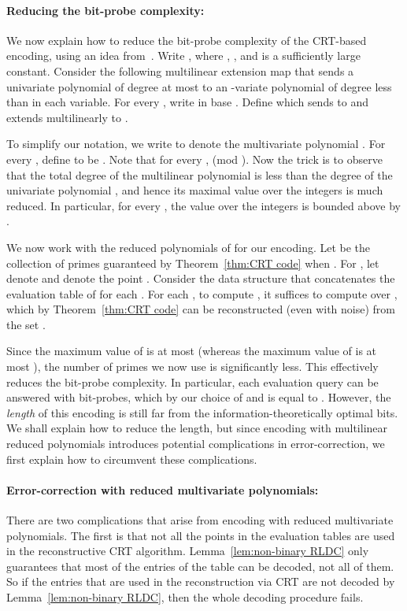 \documentclass[11pt,english]{article}
\theoremstyle{definition}
\theoremstyle{remark}
\begin{document}
\paragraph{\textbf{Reducing the bit-probe complexity:}}

We now explain how to reduce the bit-probe complexity of the CRT-based
encoding, using an idea from~\cite{kedl-umans}. Write , where
, , and  is a sufficiently
large constant. Consider the following multilinear extension map 
that sends a univariate polynomial of degree at most  to an -variate
polynomial of degree less than  in each variable. For every ,
write  in base . Define 
which sends  to  and extends
multilinearly to . 

To simplify our notation, we write  to denote the multivariate
polynomial . For every , define 
to be .
Note that for every ,  (mod ). Now
the trick is to observe that the total degree of the multilinear polynomial
 is less than the degree of the univariate polynomial ,
and hence its maximal value over the integers is much reduced.
In particular, for every , the value 
over the integers is bounded above by .

We now work with the reduced polynomials of  for our encoding.
Let  be the collection of primes guaranteed by Theorem~\ref{thm:CRT code}
when . For , let 
denote  and  denote the point .
Consider the data structure that concatenates the evaluation table
of  for each . For each ,
to compute , it suffices to compute 
over , which by Theorem~\ref{thm:CRT code} can be reconstructed
(even with noise) from the set . 

Since the maximum value of  is at most 
(whereas the maximum value of  is at most ),
the number of primes we now use is significantly less. This effectively
reduces the bit-probe complexity. In particular, each evaluation query
can be answered with 
bit-probes, which by our choice of  and  is equal to .
However, the \emph{length} of this encoding is still far from the information-theoretically
optimal  bits. We shall explain how to reduce the length,
but since encoding with multilinear reduced polynomials introduces
potential complications in error-correction, we first explain how
to circumvent these complications.

\paragraph{\textbf{Error-correction with reduced multivariate polynomials:}}

There are two complications that arise from encoding with reduced
multivariate polynomials. The first is that not all the points in
the evaluation tables are used in the reconstructive CRT algorithm.
Lemma~\ref{lem:non-binary RLDC} only guarantees that most of the
entries of the table can be decoded, not all of them. So if the entries
that are used in the reconstruction via CRT are not decoded by Lemma~\ref{lem:non-binary RLDC},
then the whole decoding procedure fails. 
\end{document}
